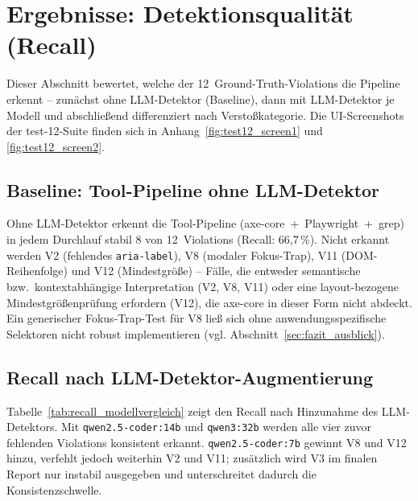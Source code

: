 \section{Ergebnisse: Detektionsqualität (Recall)}
\label{sec:ergebnisse_recall}

Dieser Abschnitt bewertet, welche der 12~Ground-Truth-Violations die Pipeline erkennt -- zunächst ohne \ac{LLM}-Detektor (Baseline), dann mit \ac{LLM}-Detektor je Modell und abschließend diffe\-renziert nach Verstoßkategorie. Die \acs{UI}-Screenshots der test-12-Suite finden sich in Anhang~\ref{fig:test12_screen1} und \ref{fig:test12_screen2}.

\subsection{Baseline: Tool-Pipeline ohne \acs{LLM}-Detektor}
\label{sec:recall_baseline}

Ohne \ac{LLM}-Detektor erkennt die Tool-Pipeline (axe-core~+~Playwright~+~grep) in jedem Durchlauf stabil 8 von 12~Violations (Recall: 66,7\,\%). Nicht erkannt werden V2 (fehlendes \texttt{aria-label}), V8 (modaler Fokus-Trap), V11 (\ac{DOM}-Reihenfolge) und V12 (Mindestgröße) -- Fälle, die entweder semantische bzw.\ kontextabhängige Interpretation (V2, V8, V11) oder eine layout-bezogene Mindestgrößenprüfung erfordern (V12), die axe-core in dieser Form nicht abdeckt. Ein generischer Fokus-Trap-Test für V8 ließ sich ohne anwendungsspezifische Selektoren nicht robust implementieren (vgl. Abschnitt~\ref{sec:fazit_ausblick}).

\subsection{Recall nach \acs{LLM}-Detektor-Augmentierung}
\label{sec:recall_llm}

Tabelle~\ref{tab:recall_modellvergleich} zeigt den Recall nach Hinzunahme des \ac{LLM}-Detektors. Mit \texttt{qwen2.5-coder:14b} und \texttt{qwen3:32b} werden alle vier zuvor fehlenden Violations konsistent erkannt. \texttt{qwen2.5-coder:7b} gewinnt V8 und V12 hinzu, verfehlt jedoch weiterhin V2 und V11; zusätzlich wird V3 im finalen Report nur instabil ausgegeben und unterschreitet dadurch die Konsistenzschwelle.

